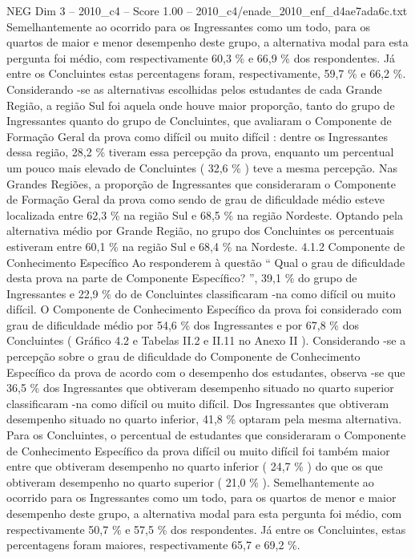 \begin{textsample}{NEG Dim 3 – 2010\_c4 – Score 1.00 – 2010\_c4/enade\_2010\_enf\_d4ae7ada6c.txt}
Semelhantemente ao ocorrido para os Ingressantes como um todo, para os quartos de maior e menor desempenho deste grupo, a alternativa modal para esta pergunta foi médio, com respectivamente 60,3 \% e 66,9 \% dos respondentes.
Já entre os Concluintes estas percentagens foram, respectivamente, 59,7 \% e 66,2 \%.
Considerando -se as alternativas escolhidas pelos estudantes de cada Grande Região, a região Sul foi aquela onde houve maior proporção, tanto do grupo de Ingressantes quanto do grupo de Concluintes, que avaliaram o Componente de Formação Geral da prova como difícil ou muito difícil : dentre os Ingressantes dessa região, 28,2 \% tiveram essa percepção da prova, enquanto um percentual um pouco mais elevado de Concluintes ( 32,6 \% ) teve a mesma percepção.
Nas Grandes Regiões, a proporção de Ingressantes que consideraram o Componente de Formação Geral da prova como sendo de grau de dificuldade médio esteve localizada entre 62,3 \% na região Sul e 68,5 \% na região Nordeste.
Optando pela alternativa médio por Grande Região, no grupo dos Concluintes os percentuais estiveram entre 60,1 \% na região Sul e 68,4 \% na Nordeste. 4.1.2 Componente de Conhecimento Específico Ao responderem à questão “ Qual o grau de dificuldade desta prova na parte de Componente Específico? ”, 39,1 \% do grupo de Ingressantes e 22,9 \% do de Concluintes classificaram -na como difícil ou muito difícil.
O Componente de Conhecimento Específico da prova foi considerado com grau de dificuldade médio por 54,6 \% dos Ingressantes e por 67,8 \% dos Concluintes ( Gráfico 4.2 e Tabelas II.2 e II.11 no Anexo II ).
Considerando -se a percepção sobre o grau de dificuldade do Componente de Conhecimento Específico da prova de acordo com o desempenho dos estudantes, observa -se que 36,5 \% dos Ingressantes que obtiveram desempenho situado no quarto superior classificaram -na como difícil ou muito difícil.
Dos Ingressantes que obtiveram desempenho situado no quarto inferior, 41,8 \% optaram pela mesma alternativa.
Para os Concluintes, o percentual de estudantes que consideraram o Componente de Conhecimento Específico da prova difícil ou muito difícil foi também maior entre que obtiveram desempenho no quarto inferior ( 24,7 \% ) do que os que obtiveram desempenho no quarto superior ( 21,0 \% ).
Semelhantemente ao ocorrido para os Ingressantes como um todo, para os quartos de menor e maior desempenho deste grupo, a alternativa modal para esta pergunta foi médio, com respectivamente 50,7 \% e 57,5 \% dos respondentes.
Já entre os Concluintes, estas percentagens foram maiores, respectivamente 65,7 e 69,2 \%.

\end{textsample}

